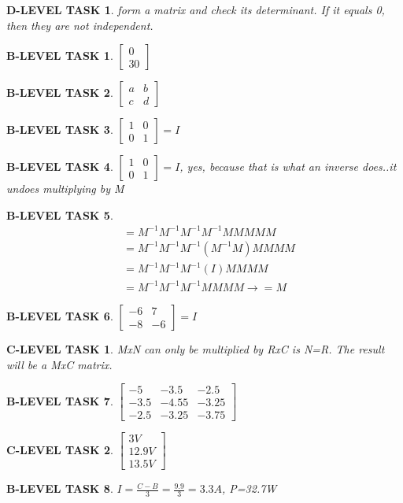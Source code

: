 \documentclass{book}
\numberwithin{equation}{section}
\newtheorem{blevel}{B-LEVEL TASK}
\newtheorem{clevel}{C-LEVEL TASK}
\newtheorem{dlevel}{D-LEVEL TASK}
\theoremstyle{definition}
\begin{document}
\begin{dlevel}form a matrix and check its determinant. If it equals 0, then they are not independent.\end{dlevel}

\begin{blevel} $\left[ \begin{matrix}0\\30 \end{matrix}\right]$ \end{blevel}
\begin{blevel} $\left[ \begin{matrix}a&b\\c&d \end{matrix}\right]$ \end{blevel}
\begin{blevel} $\left[ \begin{matrix}1&0\\0&1 \end{matrix}\right]=I$ \end{blevel}
\begin{blevel} $\left[ \begin{matrix}1&0\\0&1 \end{matrix}\right]=I$, yes, because that is what an inverse does..it undoes multiplying by M \end{blevel}
\begin{blevel} \begin{align*}
&=M^{-1}M^{-1}M^{-1}M^{-1}MMMMM\\
&=M^{-1}M^{-1}M^{-1}(M^{-1}M)MMMM\\
&=M^{-1}M^{-1}M^{-1}(I)MMMM\\
&=M^{-1}M^{-1}M^{-1}MMMM \rightarrow = M
\end{align*}
\end{blevel}
\begin{blevel} $\left[ \begin{matrix}-6&7\\-8&-6 \end{matrix}\right]=I$ \end{blevel}
\begin{clevel}MxN can only be multiplied by RxC is N=R. The result will be a MxC matrix.\end{clevel}
\begin{blevel} $\left[ \begin{matrix}-5&-3.5&-2.5\\-3.5&-4.55&-3.25\\-2.5&-3.25&-3.75 \end{matrix}\right]$ \end{blevel}
\begin{clevel} $\left[ \begin{matrix}3V\\12.9V\\13.5V \end{matrix}\right]$ 
\end{clevel}
\begin{blevel} $I=\frac{C-B}{3}=\frac{9.9}{3}=3.3A$, P=32.7W \end{blevel}
\end{document}
